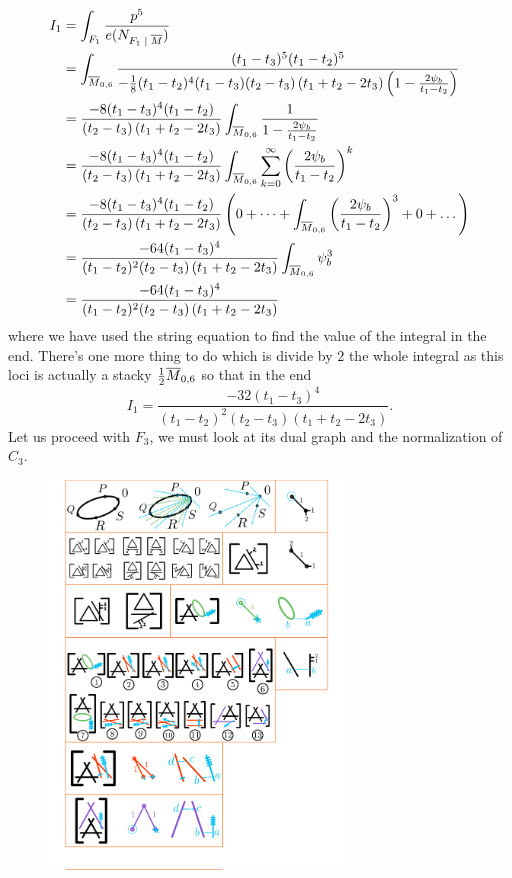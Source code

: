 \documentclass[12pt]{memoir}
\begin{document}
\begin{Ex}
\begin{align*}
        I_1&=\int_{F_1}\frac{p^5}{e(N_{F_1\mid\ov M})}\\
        &=\int_{\ov M_{0,6}}\frac{(t_1-t_3)^5(t_1-t_2)^5}{-\frac{1}{8}(t_1-t_2)^4(t_1-t_3)(t_2-t_3)\left(t_1+t_2-2t_3\right)\left(1-\frac{2\psi_b}{t_1-t_2}\right)}\\
        &=\frac{-8(t_1-t_3)^4(t_1-t_2)}{(t_2-t_3)\left(t_1+t_2-2t_3\right)}\int_{\ov M_{0,6}}\frac{1}{1-\frac{2\psi_b}{t_1-t_2}}\\
        &=\frac{-8(t_1-t_3)^4(t_1-t_2)}{(t_2-t_3)\left(t_1+t_2-2t_3\right)}\int_{\ov M_{0,6}}\sum_{k=0}^{\infty}\left(\frac{2\psi_b}{t_1-t_2}\right)^k\\
        &=\frac{-8(t_1-t_3)^4(t_1-t_2)}{(t_2-t_3)\left(t_1+t_2-2t_3\right)}\left(0+\dots+\int_{\ov M_{0,6}}\left(\frac{2\psi_b}{t_1-t_2}\right)^3+0+\dots\right)\\
        &=\frac{-64(t_1-t_3)^4}{(t_1-t_2)^2(t_2-t_3)\left(t_1+t_2-2t_3\right)}\int_{\ov M_{0,6}}\psi_b^3\\
        &=\frac{-64(t_1-t_3)^4}{(t_1-t_2)^2(t_2-t_3)\left(t_1+t_2-2t_3\right)}
    \end{align*}
    where we have used the string equation to find the value of the integral in the end. There's one more thing to do which is divide by $2$ the whole integral as this loci is actually a stacky $\half\ov{M}_{0,6}$ so that in the end
    $$I_1=\frac{-32(t_1-t_3)^4}{(t_1-t_2)^2(t_2-t_3)\left(t_1+t_2-2t_3\right)}.$$
    Let us proceed with $F_3$, we must look at its dual graph and the normalization of $C_3$. 
    \begin{figure}[h!]
        \centering
        \includegraphics[width=0.7\textwidth, trim= 1.32cm 5.6cm 9cm 19.5cm,clip]{../figs/FigsDNnotability3.pdf}

\end{figure}
\end{Ex}
\end{document}
